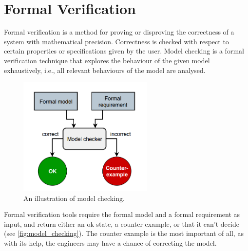 \section{Formal Verification}\label{sec:formal_verification}

Formal verification is a method for proving or disproving the correctness of a system with mathematical precision. Correctness is checked with respect to certain properties or specifications given by the user. Model checking is a formal verification technique that explores the behaviour of the given model exhaustively, i.e., all relevant behaviours of the model are analysed.

\begin{figure}[!ht]
	\centering
	\includegraphics[width=67mm, keepaspectratio]{figures/model_checking.png}\hspace{1cm}
	\caption{An illustration of model checking.}
	\label{fig:model_checking}
\end{figure}

Formal verification tools require the formal model and a formal requirement as input, and return either an ok state, a counter example, or that it can't decide (see \autoref{fig:model_checking}). The counter example is the most important of all, as with its help, the engineers may have a chance of correcting the model.
